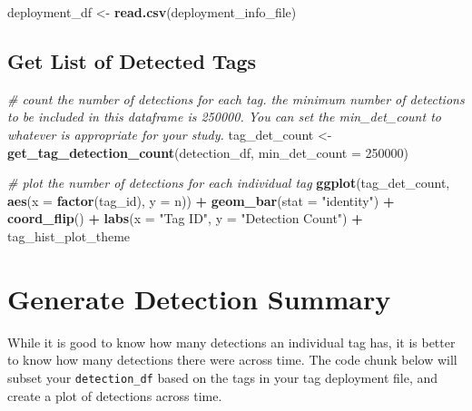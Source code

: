 \documentclass[
]{book}
\newenvironment{Shaded}{\begin{snugshade}}{\end{snugshade}}
\newcommand{\AttributeTok}[1]{\textcolor[rgb]{0.13,0.29,0.53}{#1}}
\newcommand{\CommentTok}[1]{\textcolor[rgb]{0.56,0.35,0.01}{\textit{#1}}}
\newcommand{\DecValTok}[1]{\textcolor[rgb]{0.00,0.00,0.81}{#1}}
\newcommand{\FunctionTok}[1]{\textcolor[rgb]{0.13,0.29,0.53}{\textbf{#1}}}
\newcommand{\NormalTok}[1]{#1}
\newcommand{\OtherTok}[1]{\textcolor[rgb]{0.56,0.35,0.01}{#1}}
\newcommand{\SpecialCharTok}[1]{\textcolor[rgb]{0.81,0.36,0.00}{\textbf{#1}}}
\newcommand{\StringTok}[1]{\textcolor[rgb]{0.31,0.60,0.02}{#1}}
\begin{document}
\begin{Shaded}
\begin{Highlighting}[]
\NormalTok{deployment\_df }\OtherTok{\textless{}{-}} \FunctionTok{read.csv}\NormalTok{(deployment\_info\_file)}
\end{Highlighting}
\end{Shaded}

\subsection{Get List of Detected Tags}\label{get-list-of-detected-tags}

\begin{Shaded}
\begin{Highlighting}[]
\CommentTok{\# count the number of detections for each tag. the minimum number of detections to be included in this dataframe is 250000. You can set the \textasciigrave{}min\_det\_count\textasciigrave{} to whatever is appropriate for your study.}
\NormalTok{tag\_det\_count }\OtherTok{\textless{}{-}} \FunctionTok{get\_tag\_detection\_count}\NormalTok{(detection\_df, }\AttributeTok{min\_det\_count =} \DecValTok{250000}\NormalTok{)}

\CommentTok{\# plot the number of detections for each individual tag}
\FunctionTok{ggplot}\NormalTok{(tag\_det\_count, }
       \FunctionTok{aes}\NormalTok{(}\AttributeTok{x =} \FunctionTok{factor}\NormalTok{(tag\_id), }
           \AttributeTok{y =}\NormalTok{ n)) }\SpecialCharTok{+}
  \FunctionTok{geom\_bar}\NormalTok{(}\AttributeTok{stat =} \StringTok{"identity"}\NormalTok{) }\SpecialCharTok{+}
  \FunctionTok{coord\_flip}\NormalTok{() }\SpecialCharTok{+}
  \FunctionTok{labs}\NormalTok{(}\AttributeTok{x =} \StringTok{"Tag ID"}\NormalTok{, }
       \AttributeTok{y =} \StringTok{"Detection Count"}\NormalTok{) }\SpecialCharTok{+}
\NormalTok{  tag\_hist\_plot\_theme}
\end{Highlighting}
\end{Shaded}

\section{Generate Detection Summary}\label{generate-detection-summary}

While it is good to know how many detections an individual tag has, it is better to know how many detections there were across time. The code chunk below will subset your \texttt{detection\_df} based on the tags in your tag deployment file, and create a plot of detections across time.
\end{document}

